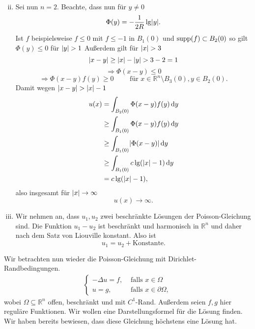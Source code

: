 \begin{bemerkung}
\begin{beweis}
\begin{enumerate}[(i)]
\begin{align*}
			\end{align*}
			\item Sei nun $n=2$. Beachte, dass nun für $y \neq 0$
			\[
				\Phi(y) = - \frac{1}{2R} \lg \lvert y\rvert.
			\] Ist $f$ beispielsweise $f \leq 0$ mit $f \leq -1$ in $B_1(0)$ und $\operatorname{supp} (f) \subset B_2(0)$ so gilt $\Phi(y) \leq 0$ für $\lvert y\rvert> 1$ 
			Außerdem gilt für $\lvert x\rvert > 3$
			\[
				\lvert x-y\rvert \geq \lvert x\rvert-\lvert y\rvert > 3- 2 = 1
			\]
			\begin{equation}
				\Rightarrow \Phi(x-y) \leq 0
			\end{equation}
			\begin{equation}
				\Rightarrow \Phi(x-y)f(y) \geq 0 \qquad \text{ für } x \in \mathbb{R}^n \setminus B_3(0), y \in B_2(0).
			\end{equation}
			Damit wegen $\lvert x-y\rvert > \lvert x\rvert-1$
			\begin{align*}
					u(x) &= \int_{B_2(0)}^{} \Phi(x-y) f(y) \,\mathrm{d}y \\
					& \geq \int_{B_1(0)}^{} \Phi(x-y)f(y) \,\mathrm{d}y \\
					& \geq  \int_{B_1(0)}^{} \lvert\Phi(x-y)\rvert \,\mathrm{d}y \\
					& \geq  \int_{B_1(0)}^{} c \lg ( \lvert x\rvert-1) \,\mathrm{d}y \\
					&= c \lg(\lvert x\rvert-1),
			\end{align*}
			also insgesamt für $\lvert x\rvert \to \infty$
			\begin{equation}
				u(x) \to  \infty.
			\end{equation}
		\item Wir nehmen an, dass $u_1,u_2$ zwei beschränkte Lösungen der Poisson-Gleichung sind. 
		Die Funktion $u_1-u_2$ ist beschränkt und harmonisch in $\mathbb{R}^n$ und daher nach dem Satz von Liouville konstant. Also ist 
		\begin{equation}
			u_1 = u_2 + \text{Konstante}.
		\end{equation}
		\end{enumerate}
	\end{beweis}
\end{bemerkung}

Wir betrachten nun wieder die Poisson-Gleichung mit Dirichlet-Randbedingungen.
\begin{align*}
	\begin{cases}
		- \Delta u = f, &\text{ falls }x \in \Omega\\
		u =g, &\text{ falls } x \in \partial \Omega,
	\end{cases}
\end{align*}
wobei $\Omega \subseteq \mathbb{R}^n$ offen, beschränkt und mit $C^1$-Rand. Außerdem seien $f,g$ hier reguläre Funktionen.
Wir wollen eine Darstellungsformel für die Lösung finden. Wir haben bereits bewiesen, dass diese Gleichung höchstens eine Lösung hat.


